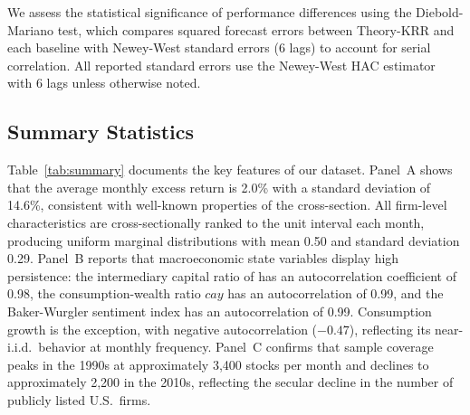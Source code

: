 We assess the statistical significance of performance differences using the Diebold-Mariano test, which compares squared forecast errors between Theory-KRR and each baseline with Newey-West standard errors (6 lags) to account for serial correlation.
All reported standard errors use the Newey-West HAC estimator with 6 lags unless otherwise noted.

\subsection{Summary Statistics}\label{sub:summary}

Table~\ref{tab:summary} documents the key features of our dataset.
Panel~A shows that the average monthly excess return is 2.0\% with a standard deviation of 14.6\%, consistent with well-known properties of the cross-section.
All firm-level characteristics are cross-sectionally ranked to the unit interval each month, producing uniform marginal distributions with mean 0.50 and standard deviation 0.29.
Panel~B reports that macroeconomic state variables display high persistence: the intermediary capital ratio of \citet{hekellymanela2017} has an autocorrelation coefficient of 0.98, the consumption-wealth ratio $cay$ has an autocorrelation of 0.99, and the Baker-Wurgler sentiment index has an autocorrelation of 0.99.
Consumption growth is the exception, with negative autocorrelation ($-0.47$), reflecting its near-i.i.d.\ behavior at monthly frequency.
Panel~C confirms that sample coverage peaks in the 1990s at approximately 3,400 stocks per month and declines to approximately 2,200 in the 2010s, reflecting the secular decline in the number of publicly listed U.S.\ firms.
